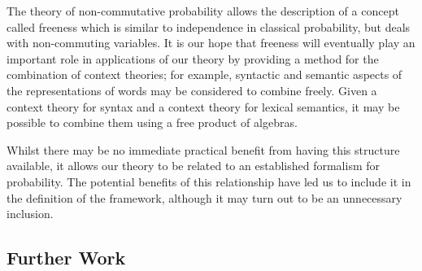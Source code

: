 The theory of non-commutative probability allows the description of a concept called freeness which is similar to independence in classical probability, but deals with non-commuting variables. It is our hope that freeness will eventually play an important role in applications of our theory by providing a method for the combination of context theories; for example, syntactic and semantic aspects of the representations of words may be considered to combine freely. Given a context theory for syntax and a context theory for lexical semantics, it may be possible to combine them using a free product of algebras.

Whilst there may be no immediate practical benefit from having this structure available, it allows our theory to be related to an established formalism for probability. The potential benefits of this relationship have led us to include it in the definition of the framework, although it may turn out to be an unnecessary inclusion.



\subsection{Further Work}

